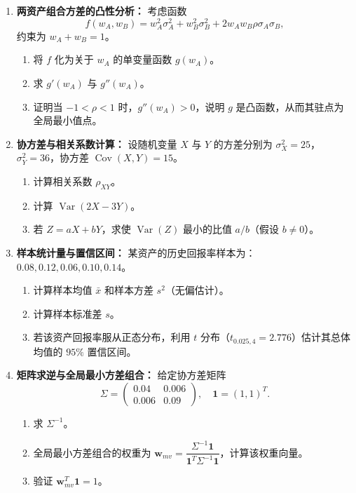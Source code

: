 \documentclass{article}
\begin{document}
\begin{enumerate}
\item \textbf{两资产组合方差的凸性分析：}
考虑函数
\[
f(w_A, w_B) = w_A^2 \sigma_A^2 + w_B^2 \sigma_B^2 + 2 w_A w_B \rho \sigma_A \sigma_B,
\]
约束为 $w_A + w_B = 1$。
\begin{enumerate}
\item 将 $f$ 化为关于 $w_A$ 的单变量函数 $g(w_A)$。
\item 求 $g'(w_A)$ 与 $g''(w_A)$。
\item 证明当 $-1 < \rho < 1$ 时，$g''(w_A) > 0$，说明 $g$ 是凸函数，从而其驻点为全局最小值点。
\end{enumerate}

\item \textbf{协方差与相关系数计算：}
设随机变量 $X$ 与 $Y$ 的方差分别为 $\sigma_X^2 = 25$，$\sigma_Y^2 = 36$，协方差 $\operatorname{Cov}(X,Y) = 15$。
\begin{enumerate}
\item 计算相关系数 $\rho_{XY}$。
\item 计算 $\operatorname{Var}(2X - 3Y)$。
\item 若 $Z = aX + bY$，求使 $\operatorname{Var}(Z)$ 最小的比值 $a/b$（假设 $b \neq 0$）。
\end{enumerate}

\item \textbf{样本统计量与置信区间：}
某资产的历史回报率样本为：$0.08, 0.12, 0.06, 0.10, 0.14$。
\begin{enumerate}
\item 计算样本均值 $\bar{x}$ 和样本方差 $s^2$（无偏估计）。
\item 计算样本标准差 $s$。
\item 若该资产回报率服从正态分布，利用 $t$ 分布（$t_{0.025,4} = 2.776$）估计其总体均值的 $95\%$ 置信区间。
\end{enumerate}

\item \textbf{矩阵求逆与全局最小方差组合：}
给定协方差矩阵
\[
\Sigma = \begin{pmatrix} 0.04 & 0.006 \\ 0.006 & 0.09 \end{pmatrix},
\quad \mathbf{1} = (1,1)^T.
\]
\begin{enumerate}
\item 求 $\Sigma^{-1}$。
\item 全局最小方差组合的权重为 $\mathbf{w}_{mv} = \dfrac{\Sigma^{-1} \mathbf{1}}{\mathbf{1}^T \Sigma^{-1} \mathbf{1}}$，计算该权重向量。
\item 验证 $\mathbf{w}_{mv}^T \mathbf{1} = 1$。
\end{enumerate}


\end{enumerate}
\end{document}
